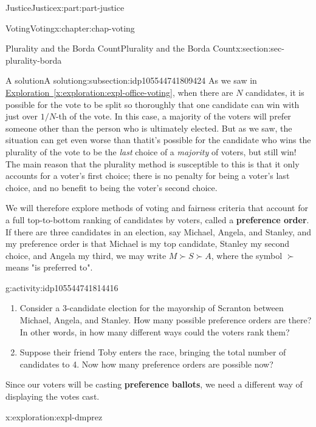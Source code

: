 \documentclass[oneside,10pt,]{book}
\newcommand{\xreffont}{\relax}
\newcommand{\terminology}[1]{\textbf{#1}}
\numberwithin{equation}{section}
\begin{document}
\begin{partptx}{Justice}{}{Justice}{}{}{x:part:part-justice}
\begin{chapterptx}{Voting}{}{Voting}{}{}{x:chapter:chap-voting}
\begin{sectionptx}{Plurality and the Borda Count}{}{Plurality and the Borda Count}{}{}{x:section:sec-plurality-borda}
\begin{subsectionptx}{A solution}{}{A solution}{}{}{g:subsection:idp105544741809424}
As we saw in \hyperref[x:exploration:expl-office-voting]{Exploration~{\xreffont\ref{x:exploration:expl-office-voting}}}, when there are \(N\) candidates, it is possible for the vote to be split so thoroughly that one candidate can win with just over \(1/N\)-th of the vote. In this case, a majority of the voters will prefer someone other than the person who is ultimately elected. But as we saw, the situation can get even worse than that\textemdash{}it's possible for the candidate who wins the plurality of the vote to be the \emph{last} choice of a \emph{majority} of voters, but still win! The main reason that the plurality method is susceptible to this is that it only accounts for a voter's first choice; there is no penalty for being a voter's last choice, and no benefit to being the voter's second choice.%
\par
{} We will therefore explore methods of voting and fairness criteria that account for a full top-to-bottom ranking of candidates by voters, called a \terminology{preference order}. If there are three candidates in an election, say Michael, Angela, and Stanley, and my preference order is that Michael is my top candidate, Stanley my second choice, and Angela my third, we may write \(M \succ S \succ A\), where the symbol \(\succ\) means "is preferred to".%
\begin{activity}{}{g:activity:idp105544741814416}%
%
\begin{enumerate}
\item{}Consider a 3-candidate election for the mayorship of Scranton between Michael, Angela, and Stanley. How many possible preference orders are there? In other words, in how many different ways could the voters rank them?%
\item{}Suppose their friend Toby enters the race, bringing the total number of candidates to 4. Now how many preference orders are possible now?%
\end{enumerate}
\end{activity}%
 Since our voters will be casting \terminology{preference ballots}, we need a different way of displaying the votes cast.%
\begin{exploration}{}{x:exploration:expl-dmprez}%

\end{exploration}
\end{subsectionptx}
\end{sectionptx}
\end{chapterptx}
\end{partptx}
\end{document}
